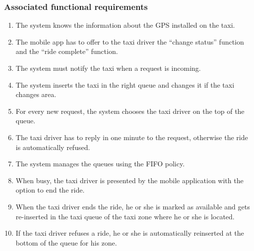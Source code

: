 \subsubsection{Associated functional requirements}
\begin{enumerate}
\item The system knows the information about the GPS installed on the taxi.
\item The mobile app has to offer to the taxi driver the ``change status'' function and the ``ride complete'' function.
\item The system must notify the taxi when a request is incoming.
\item The system inserts the taxi in the right queue and changes it if the taxi changes area.
\item For every new request, the system chooses the taxi driver on the top of the queue.
\item The taxi driver has to reply in one minute to the request, otherwise the ride is automatically refused.
\item The system manages the queues using the FIFO policy.
\item When busy, the taxi driver is presented by the mobile application with the option to end the ride.
\item When the taxi driver ends the ride, he or she is marked as available and gets re-inserted in the taxi queue of the taxi zone where he or she is located.
\item If the taxi driver refuses a ride, he or she is automatically reinserted at the bottom of the queue for his zone.
\end{enumerate}
